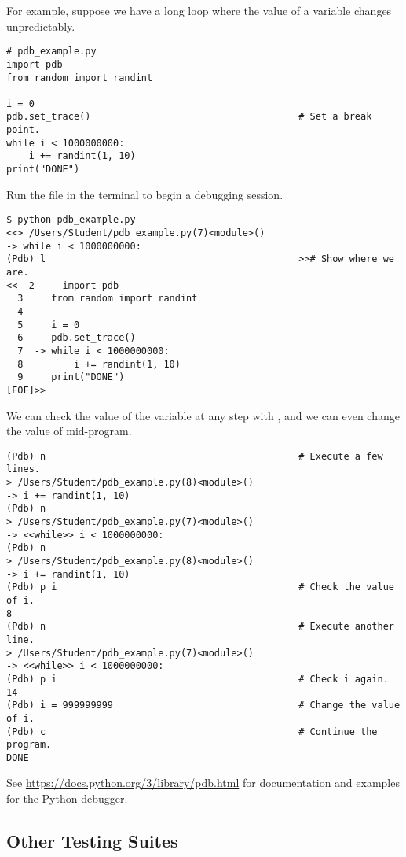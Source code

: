 For example, suppose we have a long loop where the value of a variable changes unpredictably.

\begin{lstlisting}
# pdb_example.py
import pdb
from random import randint

i = 0
pdb.set_trace()                                     # Set a break point.
while i < 1000000000:
    i += randint(1, 10)
print("DONE")
\end{lstlisting}

Run the file in the terminal to begin a debugging session.

\begin{lstlisting}
$ python pdb_example.py
<<> /Users/Student/pdb_example.py(7)<module>()
-> while i < 1000000000:
(Pdb) l                                             >># Show where we are.
<<  2     import pdb
  3     from random import randint
  4
  5     i = 0
  6     pdb.set_trace()
  7  -> while i < 1000000000:
  8         i += randint(1, 10)
  9     print("DONE")
[EOF]>>
\end{lstlisting}

We can check the value of the variable  at any step with , and we can even change the value of  mid-program.

\begin{lstlisting}
(Pdb) n                                             # Execute a few lines.
> /Users/Student/pdb_example.py(8)<module>()
-> i += randint(1, 10)
(Pdb) n
> /Users/Student/pdb_example.py(7)<module>()
-> <<while>> i < 1000000000:
(Pdb) n
> /Users/Student/pdb_example.py(8)<module>()
-> i += randint(1, 10)
(Pdb) p i                                           # Check the value of i.
8
(Pdb) n                                             # Execute another line.
> /Users/Student/pdb_example.py(7)<module>()
-> <<while>> i < 1000000000:
(Pdb) p i                                           # Check i again.
14
(Pdb) i = 999999999                                 # Change the value of i.
(Pdb) c                                             # Continue the program.
DONE
\end{lstlisting}

See \url{https://docs.python.org/3/library/pdb.html} for documentation and examples for the Python debugger.

\subsection*{Other Testing Suites} %

